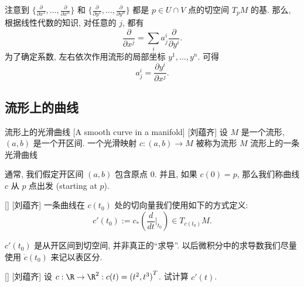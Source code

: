 \documentclass[UTF8]{ctexart}
\begin{document}
        \begin{prf}
            注意到 \(\{\frac{\partial}{\partial x^1}, \dots, \frac{\partial}{\partial x^n}\}\) 和 \(\{\frac{\partial}{\partial y^1}, \dots, \frac{\partial}{\partial y^n}\}\) 都是 \(p \in U \cap V\) 点的切空间 \(T_p M\) 的基. 那么, 根据线性代数的知识, 对任意的 \(j\), 都有
            \[
                \frac{\partial}{\partial x^j} = \sum_{i} a^i_j
                \frac{\partial}{\partial y^i}.
            \]
            为了确定系数, 左右依次作用流形的局部坐标 \(y^1, \dots, y^n\). 可得
            \[
                a^i_j = 
                \frac{\partial y^i}{\partial x^j}.
            \]
        \end{prf}
    
    \subsection{流形上的曲线}

        \begin{dfn}
            []
            {流形上的光滑曲线}
            [A smooth curve in a manifold]
            [刘蕴齐]
            设 \(M\) 是一个流形,  \((a,b)\) 是一个开区间. 一个光滑映射 \(c: (a, b) \to M\) 被称为流形 \(M\) 流形上的一条光滑曲线
        \end{dfn}

        \begin{rmk}
            []
            通常, 我们假定开区间 \((a,b)\) 包含原点 \(0\). 并且, 如果 \(c(0) = p\), 那么我们称曲线 \(c\) 从 \(p\) 点出发 (starting at  \(p\)).
        \end{rmk}
        
        \begin{dfn}
            []
            {}
            []
            [刘蕴齐]
            一条曲线在 \(c(t_0)\) 处的切向量我们使用如下的方式定义:
            \[
                c'(t_0):= c_{*}(\frac{d}{dt}|_{t_0}) \in T_{c(t_0)}M.
            \]
        \end{dfn}

        \begin{rmk}
            []
             \(c'(t_0)\) 是从开区间到切空间, 并非真正的“求导”. 以后微积分中的求导数我们尽量使用 \(\dot{c}(t_0)\) 来记以表区分. 
        \end{rmk}

        \begin{xmp}
            []
            {}
            []
            [刘蕴齐]
            设 \(c: \R \to \R^2: c(t) = {(t^2, t^3)}^T\). 试计算 \(c'(t)\). 
        \end{xmp}
\end{document}
